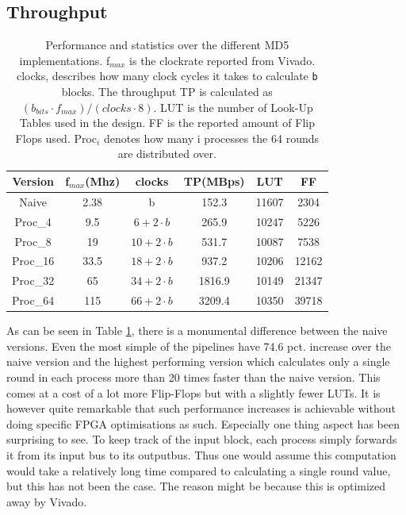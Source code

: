 \documentclass[a4paper, openany]{book}
\begin{document}
\subsection{Throughput}
\label{sec:org883f064}
\begin{table}[!htb]
\centering
\captionsetup{width=.8\linewidth}
\begin{tabular}{c c c c c c}
\hline
Version & f$_{max}$(Mhz) & clocks & TP(MBps) & LUT & FF\\
\hline
Naive & 2.38 & b & 152.3 & 11607 & 2304\\
Proc_{4} & 9.5 &   \( 6+2 \cdot b\) & 265.9 & 10247 & 5226\\
Proc_{8} & 19 &    \(10+2 \cdot b\) & 531.7 & 10087 & 7538\\
Proc_{16} & 33.5 & \(18+2 \cdot b\) & 937.2 & 10206 & 12162\\
Proc_{32} & 65 &   \(34+2 \cdot b\) & 1816.9 & 10149 & 21347\\
Proc_{64} & 115 &  \(66+2 \cdot b\) & 3209.4 & 10350 & 39718\\
\end{tabular}
\caption[MD5-versions]%
{Performance and statistics over the different MD5 implementations. f$_{max}$ is the clockrate reported from Vivado. clocks, describes how many clock cycles it takes to calculate \texttt{b} blocks. The throughput TP is calculated as \((b_{bits}\cdot f_{max})/(clocks \cdot 8)\). LUT is the number of Look-Up Tables used in the design. FF is the reported amount of Flip Flops used. Proc$_{i}$ denotes how many i processes the 64 rounds are distributed over.}
\label{tab:MD5versions}
\end{table}
As can be seen in Table \ref{tab:MD5versions}, there is a monumental difference between the naive versions. Even the most simple of the pipelines have 74.6 pct. increase over the naive version and the highest performing version which calculates only a single round in each process more than 20 times faster than the naive version. This comes at a cost of a lot more Flip-Flops but with a slightly fewer LUTs. It is however quite remarkable that such performance increases is achievable without doing specific FPGA optimisations as such. Especially one thing aspect has been surprising to see. To keep track of the input block, each process simply forwards it from its input bus to its outputbus. Thus one would assume this computation would take a relatively long time compared to calculating a single round value, but this has not been the case. The reason might be because this is optimized away by Vivado.
\end{document}
